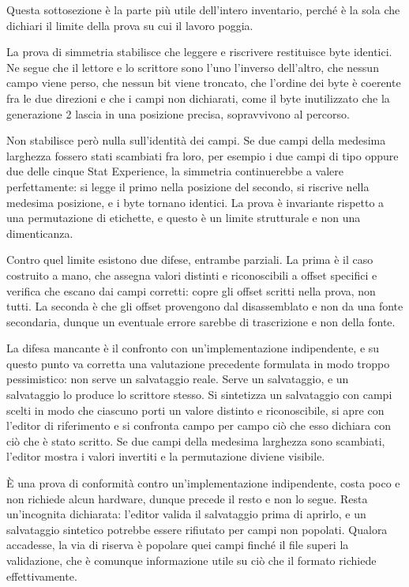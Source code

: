 Questa sottosezione è la parte più utile dell'intero inventario, perché è la sola che dichiari il limite della prova su cui il lavoro poggia.

La prova di simmetria stabilisce che leggere e riscrivere restituisce byte identici. Ne segue che il lettore e lo scrittore sono l'uno l'inverso dell'altro, che nessun campo viene perso, che nessun bit viene troncato, che l'ordine dei byte è coerente fra le due direzioni e che i campi non dichiarati, come il byte inutilizzato che la generazione 2 lascia in una posizione precisa, sopravvivono al percorso.

Non stabilisce però nulla sull'identità dei campi. Se due campi della medesima larghezza fossero stati scambiati fra loro, per esempio i due campi di tipo oppure due delle cinque Stat Experience, la simmetria continuerebbe a valere perfettamente: si legge il primo nella posizione del secondo, si riscrive nella medesima posizione, e i byte tornano identici. La prova è invariante rispetto a una permutazione di etichette, e questo è un limite strutturale e non una dimenticanza.

Contro quel limite esistono due difese, entrambe parziali. La prima è il caso costruito a mano, che assegna valori distinti e riconoscibili a offset specifici e verifica che escano dai campi corretti: copre gli offset scritti nella prova, non tutti. La seconda è che gli offset provengono dal disassemblato e non da una fonte secondaria, dunque un eventuale errore sarebbe di trascrizione e non della fonte.

La difesa mancante è il confronto con un'implementazione indipendente, e su questo punto va corretta una valutazione precedente formulata in modo troppo pessimistico: non serve un salvataggio reale. Serve un salvataggio, e un salvataggio lo produce lo scrittore stesso. Si sintetizza un salvataggio con campi scelti in modo che ciascuno porti un valore distinto e riconoscibile, si apre con l'editor di riferimento e si confronta campo per campo ciò che esso dichiara con ciò che è stato scritto. Se due campi della medesima larghezza sono scambiati, l'editor mostra i valori invertiti e la permutazione diviene visibile.

È una prova di conformità contro un'implementazione indipendente, costa poco e non richiede alcun hardware, dunque precede il resto e non lo segue. Resta un'incognita dichiarata: l'editor valida il salvataggio prima di aprirlo, e un salvataggio sintetico potrebbe essere rifiutato per campi non popolati. Qualora accadesse, la via di riserva è popolare quei campi finché il file superi la validazione, che è comunque informazione utile su ciò che il formato richiede effettivamente.

